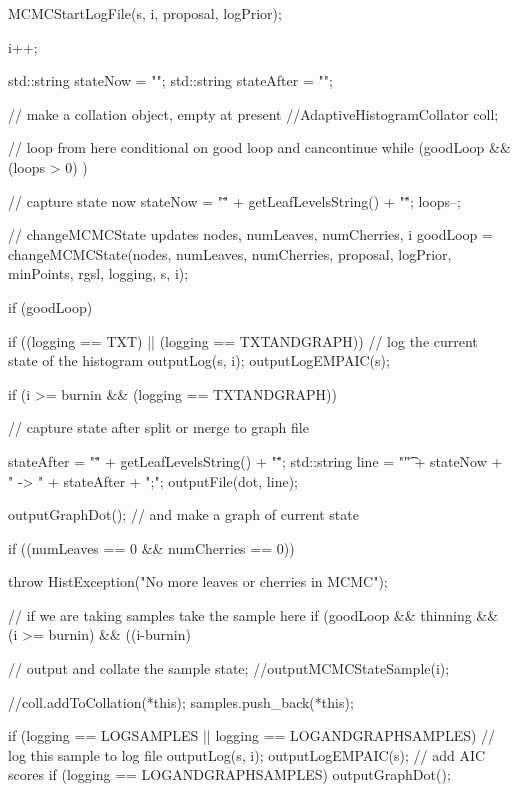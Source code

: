 \begin{DoxyCode}
{{{{            MCMCStartLogFile(s, i, proposal, logPrior);
        }

        i++;

        std::string stateNow = "";
        std::string stateAfter = "";

        // make a collation object, empty at present
        //AdaptiveHistogramCollator coll;

        // loop from here conditional on good loop and cancontinue
        while (goodLoop && (loops > 0) ) {

            // capture state now
            stateNow = "\"" + getLeafLevelsString() + "\"";
            loops--;

            // changeMCMCState updates nodes, numLeaves, numCherries, i
            goodLoop = changeMCMCState(nodes, numLeaves, numCherries, proposal,
                        logPrior, minPoints, rgsl, logging, s, i);

            if (goodLoop) {
                if ((logging == TXT) || (logging == TXTANDGRAPH)) {
                    // log the current state of the histogram
                    outputLog(s, i);
                    outputLogEMPAIC(s);
                }

                if (i >= burnin && (logging == TXTANDGRAPH)) {
                    // capture state after split or merge to graph file

                    stateAfter = "\"" + getLeafLevelsString() + "\"";
                    std::string line = "\t " + stateNow + " -> " + stateAfter +
       ";";
                    outputFile(dot, line);

                    outputGraphDot(); // and make a graph of current state
                }

                if ((numLeaves == 0 && numCherries == 0)) {
                    throw HistException("No more leaves or cherries in MCMC");

                }

                // if we are taking samples take the sample here
                if (goodLoop && thinning && (i >= burnin) &&
                        ((i-burnin)%

                    // output and collate the sample state;
                    //outputMCMCStateSample(i);
                    
                    //coll.addToCollation(*this);
          samples.push_back(*this);
          
                    if (logging == LOGSAMPLES || logging == LOGANDGRAPHSAMPLES)
       {
                        // log this sample to log file
                        outputLog(s, i);
                        outputLogEMPAIC(s); // add AIC scores
                    }
                    if (logging == LOGANDGRAPHSAMPLES) outputGraphDot();

}}}}}
\end{DoxyCode}
